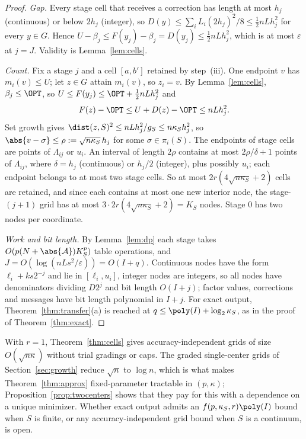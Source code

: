 \begin{proof}
\emph{Gap.} Every stage cell that receives a correction has length at most
$h_j$ (continuous) or below $2h_j$ (integer), so
$D(y)\le\sum_iL_i(2h_j)^2/8\le\frac12nLh_j^2$ for every $y\in G$. Hence
$U-\beta_j\le F(y_j)-\beta_j=D(y_j)\le\frac12nLh_j^2$, which is at most
$\varepsilon$ at $j=J$. Validity is Lemma~\ref{lem:cells}.

\emph{Count.} Fix a stage $j$ and a cell $[a,b']$ retained by step~(iii). One
endpoint $v$ has $m_i(v)\le U$; let $z\in G$ attain $m_i(v)$, so $z_i=v$.
By Lemma~\ref{lem:cells}, $\beta_j\le\OPT$, so
$U\le F(y_j)\le\OPT+\frac12nLh_j^2$ and
\[
F(z)-\OPT\le U+D(z)-\OPT\le nLh_j^2 .
\]
Set growth gives $\dist(z,S)^2\le nLh_j^2/g_S\le n\kappa_Sh_j^2$, so
$\abs{v-\sigma}\le\rho:=\sqrt{n\kappa_S}\,h_j$ for some $\sigma\in\pi_i(S)$.
The endpoints of stage cells are points of $\Lambda_{ij}$ or $u_i$. An
interval of length $2\rho$ contains at most $2\rho/\delta+1$ points of
$\Lambda_{ij}$, where $\delta=h_j$ (continuous) or $h_j/2$ (integer), plus
possibly $u_i$; each endpoint belongs to at most two stage cells. So at most
$2r(4\sqrt{n\kappa_S}+2)$ cells are retained, and since each contains at most
one new interior node, the stage-$(j+1)$ grid has at most
$3\cdot2r(4\sqrt{n\kappa_S}+2)=K_S$ nodes. Stage $0$ has two nodes per
coordinate.

\emph{Work and bit length.} By Lemma~\ref{lem:dp} each stage takes
$O(p(N+\abs{\mathcal A})K_S^p)$ table operations, and
$J=O(\log(nLs^2/\varepsilon))=O(I+q)$. Continuous nodes have the form
$\ell_i+ks2^{-j}$ and lie in $[\ell_i,u_i]$, integer nodes are integers, so
all nodes have denominators dividing $D2^j$ and bit length $O(I+j)$; factor
values, corrections and messages have bit length polynomial in $I+j$. For
exact output, Theorem~\ref{thm:transfer}(a) is reached at
$q\le\poly(I)+\log_2\kappa_S$, as in the proof of Theorem~\ref{thm:exact}.
\end{proof}

\begin{remark}\label{rem:grading}
With $r=1$, Theorem~\ref{thm:cells} gives accuracy-independent grids of
size $O(\sqrt{n\kappa})$ without trial gradings or caps. The graded
single-center grids of Section~\ref{sec:growth} reduce $\sqrt n$ to
$\log n$, which is what makes Theorem~\ref{thm:approx} fixed-parameter
tractable in $(p,\kappa)$; Proposition~\ref{prop:twocenters} shows that
they pay for this with a dependence on a unique minimizer. Whether exact
output admits an $f(p,\kappa_S,r)\poly(I)$ bound when $S$ is finite, or any
accuracy-independent grid bound when $S$ is a continuum, is open.
\end{remark}

